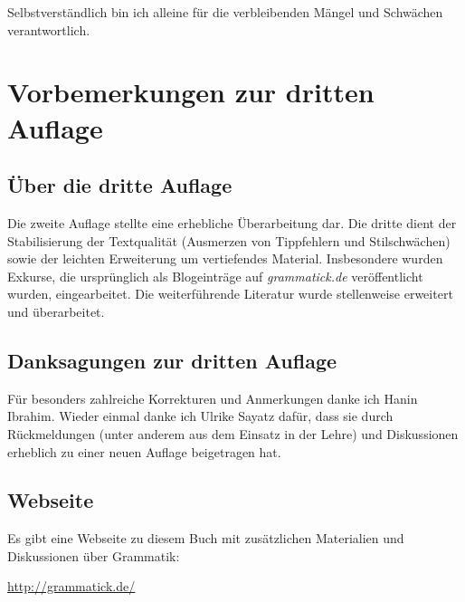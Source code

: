 Selbstverständlich bin ich alleine für die verbleibenden Mängel und Schwächen verantwortlich.




\Phantom
{}
\chapter*{Vorbemerkungen zur dritten Auflage}

\section*{Über die dritte Auflage}

Die zweite Auflage stellte eine erhebliche Überarbeitung dar.
Die dritte dient der Stabilisierung der Textqualität (Ausmerzen von Tippfehlern und Stilschwächen) sowie der leichten Erweiterung um vertiefendes Material.
Insbesondere wurden Exkurse, die ursprünglich als Blogeinträge auf \textit{grammatick.de} veröffentlicht wurden, eingearbeitet.
Die weiterführende Literatur wurde stellenweise erweitert und überarbeitet.

\section*{Danksagungen zur dritten Auflage}

Für besonders zahlreiche Korrekturen und Anmerkungen danke ich Hanin Ibrahim.
Wieder einmal danke ich Ulrike Sayatz dafür, dass sie durch Rückmeldungen (unter anderem aus dem Einsatz in der Lehre) und Diskussionen erheblich zu einer neuen Auflage beigetragen hat.


\section*{Webseite}

Es gibt eine Webseite zu diesem Buch mit zusätzlichen Materialien und Diskussionen über Grammatik:

\begin{center}
  \url{http://grammatick.de/} 
\end{center}

